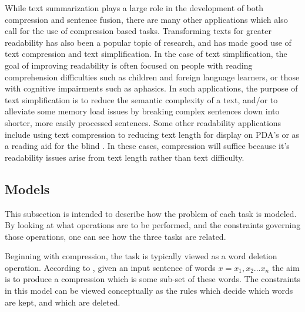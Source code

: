{{{While text summarization plays a large role in the development of both compression and sentence fusion, there are many other applications which also call for the use of compression based tasks.  Transforming texts for greater readability has also been a popular topic of research, and has made good use of text compression and text simplification.  In the case of text simplification, the goal of improving readability is often focused on people with reading comprehension difficulties such as children and foreign language learners, or those with cognitive impairments such as aphasics\citep{Feng2008}. In such applications, the purpose of text simplification is to reduce the semantic complexity of a text, and/or to alleviate some memory load issues by breaking complex sentences down into shorter, more easily processed sentences.  Some other readability applications include using text compression to reducing text length for display on PDA's \citep{Corston-Oliver 2001} or as a reading aid for the blind \citep{Grefenstette 1998}.  In these cases, compression will suffice because it's readability issues arise from text length rather than text difficulty.}
 
 
\iffalse
{Text simplification has also generated interest in the field of information extraction as a means to improve recall for some specialized document collections.  For instance, in the bio-medical field, processing documents using the standard NLP approaches of POS taggers, parse trees, and dependency trees results in poor performance due to the syntactic complexity of academic writing.  By breaking up these long syntactically complex sentences into smaller sentences using text simplification, recall is improved \citep{jonnalagadda2010biosimplify}.}
\fi


\subsection{Models}
{This subsection is intended to describe how the problem of each task is modeled.  By looking at what operations are to be performed, and the constraints governing those operations, one can see how the three tasks are related.} 

{Beginning with compression, the task is typically viewed as a word deletion operation.  According to \citet{Knight:2002:SBS:604203.604207}, given an input sentence of words $x= x_{1},x_{2}...x_{n}$ the aim is to produce a compression which is some sub-set of these words.  The constraints in this model can be viewed conceptually as the rules which decide which words are kept, and which are deleted.}


}}
